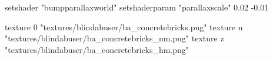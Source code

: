 	setshader "bumpparallaxworld"
	setshaderparam "parallaxscale" 0.02 -0.01

		texture 0 "textures/blindabuser/ba_concretebricks.png"
		texture n "textures/blindabuser/ba_concretebricks_nm.png"
		texture z "textures/blindabuser/ba_concretebricks_hm.png"
